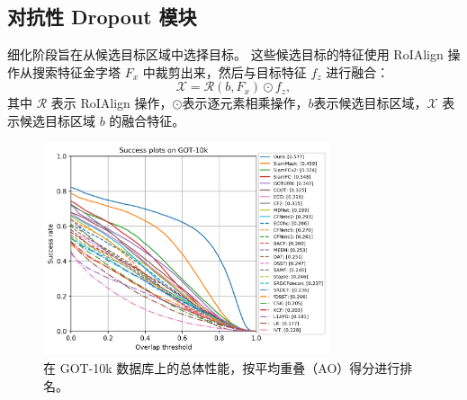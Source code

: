 \subsection{对抗性 Dropout 模块}
\label{sec:stage2}
细化阶段旨在从候选目标区域中选择目标。
这些候选目标的特征使用 RoIAlign \cite{he2017mask} 操作从搜索特征金字塔 $F_{x}$ 中裁剪出来，然后与目标特征 $f_{z}$ 进行融合：
\begin{equation}
    \mathcal{X} = \mathcal{R}(b, F_{x}) \odot f_{z},
\end{equation}
其中 $\mathcal{R}$ 表示 RoIAlign 操作，$\odot$表示逐元素相乘操作，$b$表示候选目标区域，$\mathcal{X}$ 表示候选目标区域 $b$ 的融合特征。

\begin{figure}[t]
    \centering
    \includegraphics[width=0.75\textwidth]{Img/end/success_plot.png}
    \caption{在 GOT-10k 数据库上的总体性能，按平均重叠（AO）得分进行排名。}
    \label{fig:got10k}
\end{figure}


